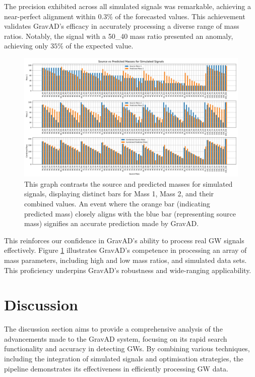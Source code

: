 \documentclass[twocolumn, aps, pra]{revtex4-2}
\begin{document}
The precision exhibited across all simulated signals was remarkable, achieving a near-perfect alignment within $0.3\%$ of the forecasted values. This achievement validates GravAD's efficacy in accurately processing a diverse range of mass ratios. Notably, the signal with a 50\_40 mass ratio presented an anomaly, achieving only $35\%$ of the expected value.

\begin{figure}[b]
	\centering
	\includegraphics[width=\textwidth]{sim_sig_plot.png}
	\caption{This graph contrasts the source and predicted masses for simulated signals, displaying distinct bars for Mass 1, Mass 2, and their combined values. An event where the orange bar (indicating predicted mass) closely aligns with the blue bar (representing source mass) signifies an accurate prediction made by GravAD.}
	\label{fig:sim}
\end{figure}

This reinforces our confidence in GravAD's ability to process real GW signals effectively. Figure \ref{fig:sim} illustrates GravAD's competence in processing an array of mass parameters, including high and low mass ratios, and simulated data sets. This proficiency underpins GravAD's robustness and wide-ranging applicability. 
	
	\section{Discussion}
	
	The discussion section aims to provide a comprehensive analysis of the advancements made to the GravAD system, focusing on its rapid search functionality and accuracy in detecting GWs. By combining various techniques, including the integration of simulated signals and optimisation strategies, the pipeline demonstrates its effectiveness in efficiently processing GW data. 
	
\end{document}
